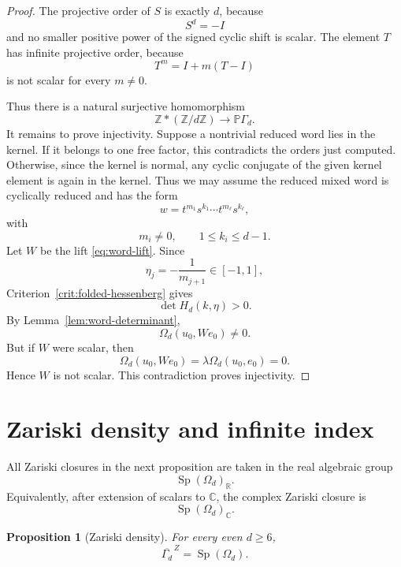 \documentclass[a4paper,11pt]{amsart}
\newcommand{\Z}{\mathbb Z}
\newcommand{\R}{\mathbb R}
\newcommand{\C}{\mathbb C}
\newcommand{\Pj}{\mathbb P}
\newcommand{\Sp}{\operatorname{Sp}}
\newtheorem{proposition}[theorem]{Proposition}
\theoremstyle{remark}
\numberwithin{equation}{section}
\begin{document}
\begin{proof}
The projective order of \(S\) is exactly \(d\), because
\[
S^d=-I
\]
and no smaller positive power of the signed cyclic shift is scalar. The element \(T\) has infinite projective order, because
\[
T^m=I+m(T-I)
\]
is not scalar for every \(m\neq0\).

Thus there is a natural surjective homomorphism
\[
\Z*(\Z/d\Z)\longrightarrow \Pj\Gamma_d.
\]
It remains to prove injectivity. Suppose a nontrivial reduced word lies in the kernel. If it belongs to one free factor, this contradicts the orders just computed. Otherwise, since the kernel is normal, any cyclic conjugate of the given kernel element is again in the kernel. Thus we may assume the reduced mixed word is cyclically reduced and has the form
\[
w=t^{m_1}s^{k_1}\cdots t^{m_\ell}s^{k_\ell},
\]
with
\[
m_i\neq0,
\qquad
1\leq k_i\leq d-1.
\]
Let \(W\) be the lift \eqref{eq:word-lift}. Since
\[
\eta_j=-\frac1{m_{j+1}}\in[-1,1],
\]
Criterion~\ref{crit:folded-hessenberg} gives
\[
\det H_d(k,\eta)>0.
\]
By Lemma~\ref{lem:word-determinant},
\[
\Omega_d(u_0,We_0)\neq0.
\]
But if \(W\) were scalar, then
\[
\Omega_d(u_0,We_0)
=
\lambda\Omega_d(u_0,e_0)
=
0.
\]
Hence \(W\) is not scalar. This contradiction proves injectivity.
\end{proof}

\section{Zariski density and infinite index}

All Zariski closures in the next proposition are taken in the real algebraic group
\[
\Sp(\Omega_d)_{\R}.
\]
Equivalently, after extension of scalars to \(\C\), the complex Zariski closure is
\[
\Sp(\Omega_d)_{\C}.
\]

\begin{proposition}[Zariski density]\label{prop:zariski-density}
For every even \(d\geq6\),
\[
\overline{\Gamma_d}^{\,Z}=\Sp(\Omega_d).
\]
\end{proposition}
\end{document}
